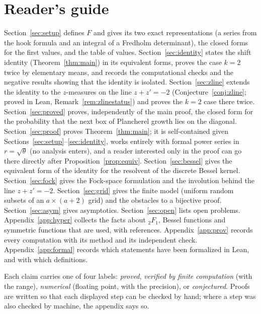 \documentclass[11pt]{article}
\theoremstyle{definition}
\theoremstyle{remark}
\begin{document}
\section*{Reader's guide}
Section~\ref{sec:setup} defines $F$ and gives its two exact representations (a series from the hook formula and an integral of a Fredholm determinant), the closed forms for the first values, and the table of values. Section~\ref{sec:identity} states the shift identity (Theorem~\ref{thm:main}) in its equivalent forms, proves the case $k=2$ twice by elementary means, and records the computational checks and the negative results showing that the identity is isolated. Section~\ref{sec:zline} extends the identity to the $z$-measures on the line $z+z'=-2$ (Conjecture~\ref{conj:zline}; proved in Lean, Remark~\ref{rem:zlinestatus}) and proves the $k=2$ case there twice. Section~\ref{sec:proved} proves, independently of the main proof, the closed form for the probability that the next box of Plancherel growth lies on the diagonal. Section~\ref{sec:proof} proves Theorem~\ref{thm:main}; it is self-contained given Sections~\ref{sec:setup}--\ref{sec:identity}, works entirely with formal power series in $r=\sqrt\theta$ (no analysis enters), and a reader interested only in the proof can go there directly after Proposition~\ref{prop:equiv}. Section~\ref{sec:bessel} gives the equivalent form of the identity for the resolvent of the discrete Bessel kernel. Section~\ref{sec:fock} gives the Fock-space formulation and the involution behind the line $z+z'=-2$. Section~\ref{sec:grid} gives the finite model (uniform random subsets of an $a\times(a+2)$ grid) and the obstacles to a bijective proof. Section~\ref{sec:asym} gives asymptotics. Section~\ref{sec:open} lists open problems. Appendix~\ref{app:hyper} collects the facts about ${}_2F_1$, Bessel functions and symmetric functions that are used, with references. Appendix~\ref{app:prov} records every computation with its method and its independent check. Appendix~\ref{app:formal} records which statements have been formalized in Lean, and with which definitions.

Each claim carries one of four labels: \emph{proved}, \emph{verified by finite computation} (with the range), \emph{numerical} (floating point, with the precision), or \emph{conjectured}. Proofs are written so that each displayed step can be checked by hand; where a step was also checked by machine, the appendix says so.
\end{document}
